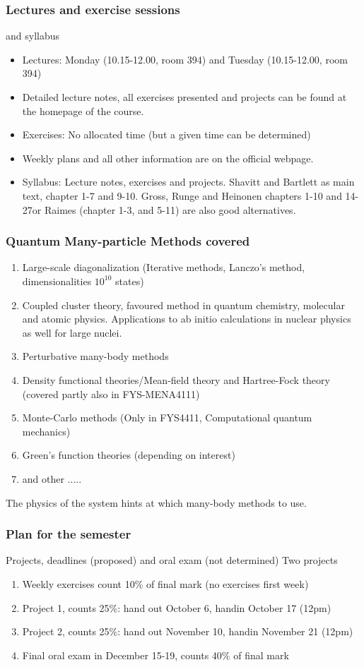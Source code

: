 \documentclass[compress]{beamer}
\begin{document}
\frame
{
  \frametitle{Lectures and exercise sessions}
  \begin{block}{and syllabus}
\begin{itemize}
\item Lectures: Monday (10.15-12.00, room 394) and Tuesday (10.15-12.00, room 394)
       \item Detailed lecture notes, all exercises presented and projects
can be found at the homepage of the course.
       \item Exercises: No allocated time (but a given time can be determined)
       \item Weekly plans and all other information are on the official webpage.
\item Syllabus: Lecture notes, exercises and projects. Shavitt and Bartlett as main text, chapter 1-7 and 9-10. Gross, Runge and Heinonen chapters 1-10 and 14-27or  Raimes (chapter 1-3, and 5-11) are also good alternatives.
\end{itemize}
  \end{block}
}


\frame
{
  \frametitle{Quantum Many-particle Methods covered}
\begin{small}
{\scriptsize
\begin{enumerate}
\item Large-scale diagonalization (Iterative methods, Lanczo's method, dimensionalities 
$10^{10}$ states)
\item Coupled cluster theory, favoured method in quantum chemistry, 
molecular and atomic physics. Applications to ab initio calculations in 
nuclear physics as well for large nuclei.
\item Perturbative many-body methods 
\item Density functional theories/Mean-field theory and Hartree-Fock theory (covered partly also in FYS-MENA4111)
\item Monte-Carlo methods (Only in FYS4411, Computational quantum mechanics)
\item Green's function theories (depending on interest)
\item and other .....
\end{enumerate}
The physics of the system hints at which many-body methods to use.
}
\end{small}
}




\frame
{
  \frametitle{Plan for the semester}
  \begin{block}{Projects, deadlines (proposed) and oral exam (not determined)}
Two projects
\begin{enumerate}
\item Weekly exercises count 10\% of final mark (no exercises  first week)
\item Project 1, counts 25\%: hand out October 6, handin October 17 (12pm)
\item  Project 2, counts 25\%: hand out November 10, handin November 21 (12pm)
\item Final oral exam in December 15-19, counts 40\% of final mark
\end{enumerate}
  \end{block}
} 
\end{document}
